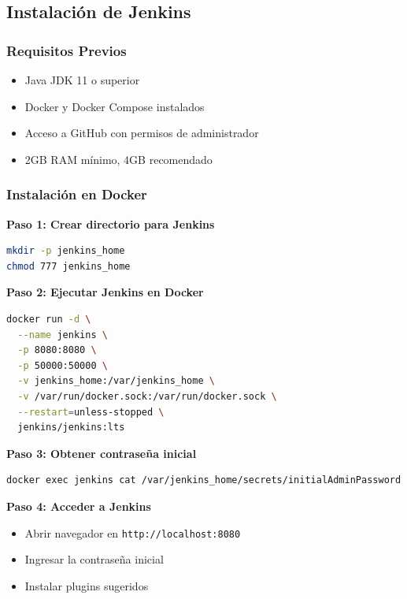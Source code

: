 \documentclass[12pt,a4paper]{article}
\begin{document}
\subsection{Instalación de Jenkins}

\subsubsection{Requisitos Previos}

\begin{itemize}
    \item Java JDK 11 o superior
    \item Docker y Docker Compose instalados
    \item Acceso a GitHub con permisos de administrador
    \item 2GB RAM mínimo, 4GB recomendado
\end{itemize}

\subsubsection{Instalación en Docker}

\textbf{Paso 1: Crear directorio para Jenkins}
\begin{lstlisting}[language=bash]
mkdir -p jenkins_home
chmod 777 jenkins_home
\end{lstlisting}

\textbf{Paso 2: Ejecutar Jenkins en Docker}
\begin{lstlisting}[language=bash]
docker run -d \
  --name jenkins \
  -p 8080:8080 \
  -p 50000:50000 \
  -v jenkins_home:/var/jenkins_home \
  -v /var/run/docker.sock:/var/run/docker.sock \
  --restart=unless-stopped \
  jenkins/jenkins:lts
\end{lstlisting}

\textbf{Paso 3: Obtener contraseña inicial}
\begin{lstlisting}[language=bash]
docker exec jenkins cat /var/jenkins_home/secrets/initialAdminPassword
\end{lstlisting}

\textbf{Paso 4: Acceder a Jenkins}
\begin{itemize}
    \item Abrir navegador en \texttt{http://localhost:8080}
    \item Ingresar la contraseña inicial
    \item Instalar plugins sugeridos
\end{itemize}
\end{document}
